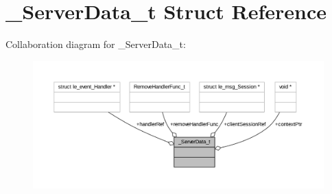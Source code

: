 \hypertarget{struct___server_data__t}{}\section{\+\_\+\+Server\+Data\+\_\+t Struct Reference}
\label{struct___server_data__t}


Collaboration diagram for \+\_\+\+Server\+Data\+\_\+t\+:
\nopagebreak
\begin{figure}[H]
\begin{center}
\leavevmode
\includegraphics[width=350pt]{struct___server_data__t__coll__graph}
\end{center}
\end{figure}
